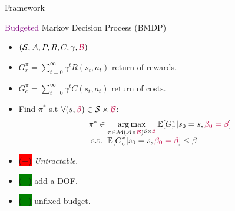 \documentclass{beamer}
\newcommand{\cplus}{\colorbox{green}{($+$)} }
\newcommand{\cmoins}{\colorbox{red}{($-$)} }
\begin{document}
    \begin{frame}{Framework}

        \begin{block}{\textcolor{purple}{Budgeted} Markov Decision Process (BMDP)}
            \begin{itemize}
                \item $(\mathcal{S}, \mathcal{A}, P, R,{C}, \gamma,\textcolor{purple}{\mathcal{B}})$
                \item $G_r^\pi = \sum_{t=0}^\infty \gamma^t R(s_t, a_t)$ return of rewards.
                \item  $G_c^\pi = \sum_{t=0}^\infty \gamma^t C(s_t, a_t)$ return of costs.
                \item Find $\pi^*$ s.t $\forall (s,\textcolor{purple}{\beta})\in\mathcal{S}\times\textcolor{purple}{\mathcal{B}}$:
                \begin{equation}
                    \label{eq:bmdp}
                    \begin{array}{lcr}
                        \displaystyle \pi^* \in \operatorname*{arg\,max}_{\pi\in\mathcal{M}(\mathcal{A}\times\textcolor{purple}{\mathcal{B}})^{\mathcal{S}\times\textcolor{purple}{\mathcal{B}}}} \operatorname*{\mathbb{E}}[G_r^\pi | s_0=s,\textcolor{purple}{\beta_0=\beta}] \\
                        \text{ s.t. }  \operatorname*{\mathbb{E}}[G_c^\pi | s_0=s,\textcolor{purple}{\beta_0=\beta}] \leq \beta
                    \end{array}
                \end{equation}
            \end{itemize}
        \end{block}


        \begin{block}{}
            \begin{itemize}
                \item \cmoins \textit{Untractable}.
                \item \cplus add a DOF.
                \item \cplus unfixed budget.

            \end{itemize}
        \end{block}

    \end{frame}
\end{document}
